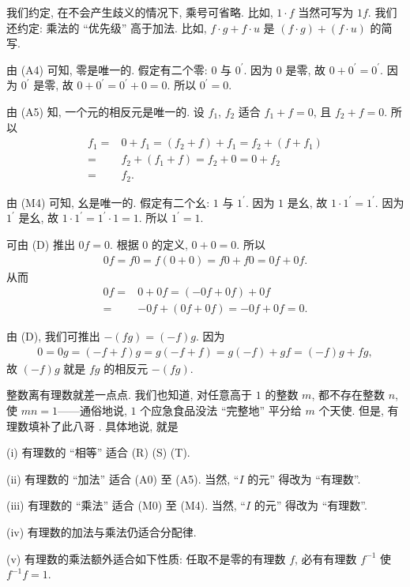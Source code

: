 我们约定, 在不会产生歧义的情况下, 乘号可省略. 比如, $1 \cdot f$ 当然可写为 $1f$. 我们还约定: 乘法的 ``优先级'' 高于加法. 比如, $f \cdot g + f \cdot u$ 是 $(f \cdot g) + (f \cdot u)$ 的简写.

由 (A4) 可知, 零是唯一的. 假定有二个零: $0$ 与 $0^{\prime}$. 因为 $0$ 是零, 故 $0 + 0^{\prime} = 0^{\prime}$. 因为 $0^{\prime}$ 是零, 故 $0 + 0^{\prime} = 0^{\prime} + 0 = 0$. 所以 $0^{\prime} = 0$.

由 (A5) 知, 一个元的相反元是唯一的. 设 $f_1$, $f_2$ 适合 $f_1 + f = 0$, 且 $f_2 + f = 0$. 所以
\begin{align*}
    f_1
    = {} & 0 + f_1 = (f_2 + f) + f_1 = f_2 + (f + f_1) \\
    = {} & f_2 + (f_1 + f) = f_2 + 0 = 0 + f_2         \\
    = {} & f_2.
\end{align*}

由 (M4) 可知, 幺是唯一的. 假定有二个幺: $1$ 与 $1^{\prime}$. 因为 $1$ 是幺, 故 $1 \cdot 1^{\prime} = 1^{\prime}$. 因为 $1^{\prime}$ 是幺, 故 $1 \cdot 1^{\prime} = 1^{\prime} \cdot 1 = 1$. 所以 $1^{\prime} = 1$.

可由 (D) 推出 $0f = 0$. 根据 $0$ 的定义, $0 + 0 = 0$. 所以
\begin{align*}
    0f = f0 = f(0 + 0) = f0 + f0 = 0f + 0f.
\end{align*}
从而
\begin{align*}
    0f
    = {} & 0 + 0f = (-0f + 0f) + 0f          \\
    = {} & {-0f} + (0f + 0f) = -0f + 0f = 0.
\end{align*}

由 (D), 我们可推出 $-(fg) = (-f)g$. 因为
\begin{align*}
    0 = 0g = (-f + f)g = g(-f + f) = g(-f) + gf = (-f)g + fg,
\end{align*}
故 $(-f)g$ 就是 $fg$ 的相反元 $-(fg)$.

整数离有理数就差一点点. 我们也知道, 对任意高于 $1$ 的整数 $m$, 都不存在整数 $n$, 使 $mn = 1$——通俗地说, $1$ 个应急食品没法 ``完整地'' 平分给 $m$ 个天使. 但是, 有理数填补了此八哥 . 具体地说, 就是
\begin{proposition}
    (i) 有理数的 ``相等'' 适合 (R) (S) (T).

    (ii) 有理数的 ``加法'' 适合 (A0) 至 (A5). 当然, ``$I$ 的元'' 得改为 ``有理数''.

    (iii) 有理数的 ``乘法'' 适合 (M0) 至 (M4). 当然, ``$I$ 的元'' 得改为 ``有理数''.

    (iv) 有理数的加法与乘法仍适合分配律.

    (v) 有理数的乘法额外适合如下性质: 任取不是零的有理数 $f$, 必有有理数 $f^{-1}$ 使 $f^{-1} f = 1$.
\end{proposition}

